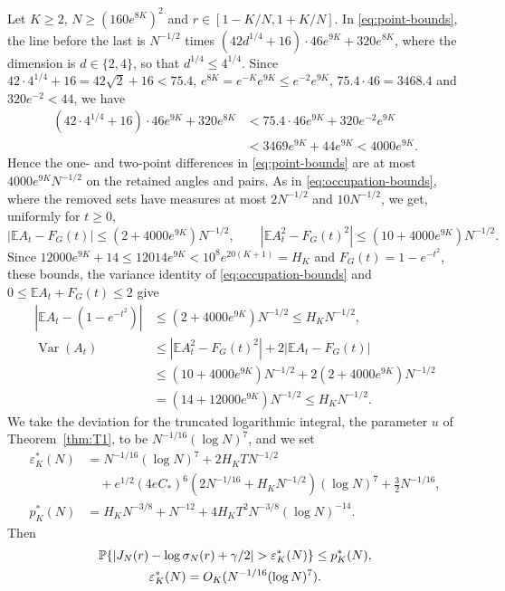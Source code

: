 Let $K\ge2$, $N\ge(160e^{8K})^2$ and $r\in[1-K/N,1+K/N]$.
In \eqref{eq:point-bounds}, the line before the last is $N^{-1/2}$ times
$(42d^{1/4}+16)\cdot46e^{9K}+320e^{8K}$, where the dimension is
$d\in\{2,4\}$, so that $d^{1/4}\le4^{1/4}$. Since
$42\cdot4^{1/4}+16=42\sqrt2+16<75.4$,
$e^{8K}=e^{-K}e^{9K}\le e^{-2}e^{9K}$, $75.4\cdot46=3468.4$ and
$320e^{-2}<44$, we have
\begin{align*}
 (42\cdot4^{1/4}+16)\cdot46e^{9K}+320e^{8K}
 &<75.4\cdot46e^{9K}+320e^{-2}e^{9K}\\
 &<3469e^{9K}+44e^{9K}<4000e^{9K}.
\end{align*}
Hence the one- and two-point differences in \eqref{eq:point-bounds} are
at most $4000e^{9K}N^{-1/2}$ on the retained angles and pairs. As in
\eqref{eq:occupation-bounds}, where the removed sets have measures at
most $2N^{-1/2}$ and $10N^{-1/2}$, we get, uniformly for $t\ge0$,
\[
 |\mathbb EA_t-F_G(t)|\le(2+4000e^{9K})N^{-1/2},\qquad
 |\mathbb EA_t^2-F_G(t)^2|\le(10+4000e^{9K})N^{-1/2}.
\]
Since $12000e^{9K}+14\le12014e^{9K}<10^8e^{20(K+1)}=H_K$ and
$F_G(t)=1-e^{-t^2}$, these bounds, the variance identity of
\eqref{eq:occupation-bounds} and $0\le\mathbb EA_t+F_G(t)\le2$ give
\begin{align}
 |\mathbb EA_t-(1-e^{-t^2})|&\le(2+4000e^{9K})N^{-1/2}
 \le H_KN^{-1/2},\nonumber\\
 \operatorname{Var}(A_t)
 &\le|\mathbb EA_t^2-F_G(t)^2|+2|\mathbb EA_t-F_G(t)|\nonumber\\
 &\le(10+4000e^{9K})N^{-1/2}+2(2+4000e^{9K})N^{-1/2}\nonumber\\
 &=(14+12000e^{9K})N^{-1/2}\le H_KN^{-1/2}.
 \label{eq:layer2-occupation}
\end{align}
We take the deviation for the truncated logarithmic integral, the
parameter $u$ of Theorem~\ref{thm:T1}, to be $N^{-1/16}(\log N)^7$, and
we set
\begin{align*}
 \varepsilon_K^*(N)&=N^{-1/16}(\log N)^7+2H_KTN^{-1/2}\\
 &\quad+e^{1/2}(4eC_*)^6(2N^{-1/16}+H_KN^{-1/2})(\log N)^7+\tfrac32N^{-1/16},\\
 p_K^*(N)&=H_KN^{-3/8}+N^{-12}
 +4H_KT^2N^{-3/8}(\log N)^{-14}.
\end{align*}
Then
\begin{equation}
 \begin{gathered}
 \Prob\{|J_N(r)-\log\sigma_N(r)+\gamma/2|>\varepsilon_K^*(N)\}
 \le p_K^*(N),\\
 \varepsilon_K^*(N)=O_K(N^{-1/16}(\log N)^7).
 \end{gathered}
                                                        \label{eq:layer2-log}
\end{equation}
